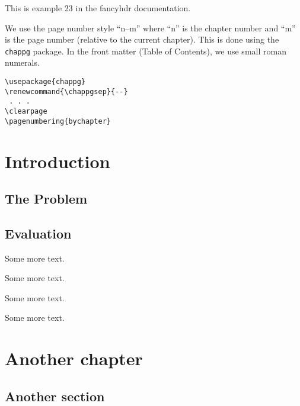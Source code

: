 \documentclass[openany]{book}
\renewcommand{\chappgsep}{--}
\begin{document}
\tableofcontents
\bigskip

\noindent
\begin{boxedminipage}{\textwidth}
This is example 23 in the fancyhdr documentation.

We use the page number style ``n--m'' where ``n'' is the chapter number and ``m'' is the page number (relative to the current chapter). 
This is done using the \texttt{chappg} package. In the front matter (Table of Contents), we use small roman numerals.

\begin{verbatim}
\usepackage{chappg}
\renewcommand{\chappgsep}{--}
 . . .
\clearpage
\pagenumbering{bychapter}
\end{verbatim}
\end{boxedminipage}

\clearpage
{}
\chapter{Introduction}

\lipsum

\section{The Problem}

\lipsum[1]

\section{Evaluation}

\lipsum

Some more text.

Some more text.

Some more text.

Some more text.

\chapter{Another chapter}

\lipsum[2]

\section{Another section}

\lipsum[3-5]
\end{document}

